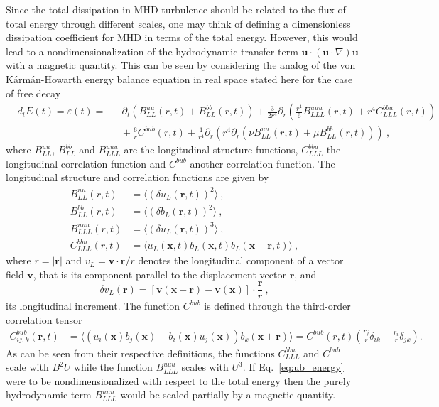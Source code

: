 \documentclass[aps,pre,onecolumn,superscriptaddress,notitlepage]{revtex4-1}
\newcommand{\vep}{\varepsilon}
\renewcommand{\vec}[1]{\bm{#1}}
\renewcommand{\vr}{\vec{r}}
\newcommand{\beq}{\begin{equation}}
\newcommand{\eeq}{\end{equation}}
\begin{document}
Since the total dissipation in MHD turbulence should be related to the 
flux of total energy through different scales, one may think of defining 
a dimensionless dissipation coefficient for MHD in terms of the total 
energy. However, this would lead to a nondimensionalization of 
the hydrodynamic transfer term 
$\vec{u}\cdot(\vec{u}\cdot \nabla) \vec{u}$ with a magnetic quantity.
This can be seen by considering the analog of the von K\'arm\'an-Howarth energy balance equation in real space
\cite{Chandrasekhar51} stated here for the case of free decay
\begin{align}
-d_t E(t)=\vep(t) = &  -\partial_t (B_{LL}^{uu}(r,t)+B_{LL}^{bb}(r,t))
 +\frac{3}{2r^4} \partial_r \left(\frac{r^4}{6} B_{LLL}^{uuu}(r,t) +r^4 C_{LLL}^{bbu}(r,t) \right)  \nonumber \\
&  \ \ \ + \frac{6}{r} C^{bub}(r,t) + \frac{1}{r^4} \partial_r \left (r^4 \partial_r (\nu B_{LL}^{uu}(r,t)+ \mu B_{LL}^{bb}(r,t)) \right) \ , 
\label{eq:ub_energy}
\end{align}
where $B_{LL}^{uu}$, $B_{LL}^{bb}$ and $B_{LLL}^{uuu}$ are the longitudinal structure functions, 
$C_{LLL}^{bbu}$ the longitudinal correlation function and $C^{bub}$ another correlation function. The 
longitudinal structure and correlation functions are given by
\begin{align}
B_{LL}^{uu}(r,t)&= \langle (\delta u_L(\vec{r},t))^2  \rangle \ , \\ 
B_{LL}^{bb}(r,t)&= \langle (\delta b_L(\vec{r},t))^2 \rangle  \ , \\
B_{LLL}^{uuu}(r,t)&= \langle (\delta u_L(\vec{r},t))^3 \rangle  \ , \\ 
C_{LLL}^{bbu}(r,t)&= \langle u_L(\vec{x},t) b_L(\vec{x},t) b_L(\vec{x} + \vec{r},t) \rangle \ ,  
\end{align}
where $r=|\vr|$ and
$v_L = \vec{v}\cdot\vec{r}/r$ denotes the longitudinal component of a vector field $\vec{v}$,
that is its component parallel to the displacement vector $\vec{r}$, and
\beq
\delta v_L(\vr) = [\vec{v}(\vec{x}+\vec{r})-\vec{v}(\vec{x})]\cdot \frac{\vec{r}}{r} \ ,
\eeq
its longitudinal increment. The function $C^{bub}$ is defined through the third-order 
correlation tensor
\begin{align}
C_{ij,k}^{bub}(\vec{r},t)&= 
\langle (u_i(\vec{x}) b_j(\vec{x})-b_i(\vec{x}) u_j(\vec{x})) b_k(\vec{x} + \vec{r}) \rangle = 
C^{bub}(r,t)\left(\frac{r_j}{r} \delta_{ik} - \frac{r_i}{r} \delta_{jk}  \right)  . \  
\end{align}
As can be seen from their respective definitions, the functions $C_{LLL}^{bbu}$
and $C^{bub}$ scale with $B^2U$ while the function $B_{LLL}^{uuu}$ scales with
$U^3$. If Eq.~\eqref{eq:ub_energy} were to be nondimensionalized with 
respect to the total energy 
then the purely hydrodynamic term $B_{LLL}^{uuu}$ would be scaled partially 
by a magnetic quantity. \\
\end{document}
